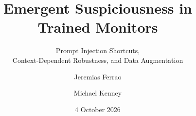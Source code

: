 \documentclass[aspectratio=169,11pt,usepdftitle=false]{beamer}
\title[Emergent Suspiciousness]{Emergent Suspiciousness in Trained Monitors}
\subtitle{Prompt Injection Shortcuts,\\
    Context-Dependent Robustness, and Data Augmentation}
\author[Ferrao \& Kenney]{Jeremias Ferrao \and Michael Kenney}
\date{4 October 2026}
\begin{document}
\begin{frame}[plain]
    \titlepage
\end{frame}


\end{document}
